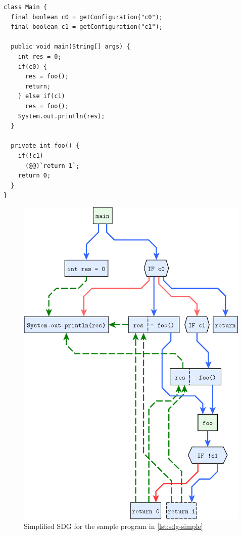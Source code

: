 \begin{lstlisting}[float=p,label=lst:sdg-simple,
  caption={Program using load-time variability resulting in the SDG in \autoref{fig:sdg-simple}}]
class Main {
  final boolean c0 = getConfiguration("c0");
  final boolean c1 = getConfiguration("c1");
  
  public void main(String[] args) {
    int res = 0;
    if(c0) {
      res = foo();
      return;
    } else if(c1)
      res = foo();
    System.out.println(res);
  }
  
  private int foo() {
    if(!c1)
      (@@)`return 1`;
    return 0;
  }
}
\end{lstlisting}

\begin{figure}[p]
  \centering
    \includegraphics[scale=0.6]{sdgs/simple}
  \caption{Simplified SDG for the sample program in \autoref{lst:sdg-simple}}
  \label{fig:sdg-simple}
\end{figure}
